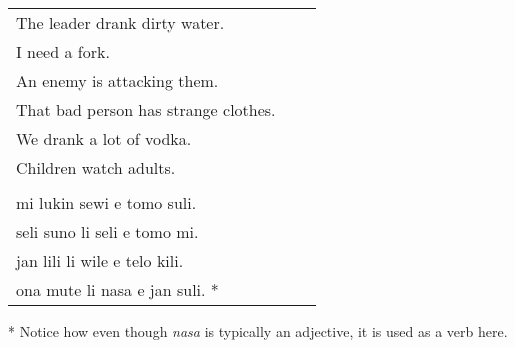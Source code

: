 \begin{supertabular}{p{5,5cm}|ll}
   The leader drank dirty water. &&   \\ %
   I need a fork.   &&   \\ %
   An enemy is attacking them.   &&   \\ %
   That bad person has strange clothes.   &&  \\  %
   We drank a lot of vodka.   &&   \\ %
   Children watch adults.   &&   \\ %
 && \\ %
   mi lukin sewi e tomo suli.  &&    \\ %
   seli suno li seli e tomo mi.  &&   \\ %
   jan lili li wile e telo kili.  &&  \\ %
   ona mute li nasa e jan suli. * &&  \\ %
\end{supertabular} 

* Notice how even though \textit{nasa} is typically an adjective, it is used as a verb here. 
